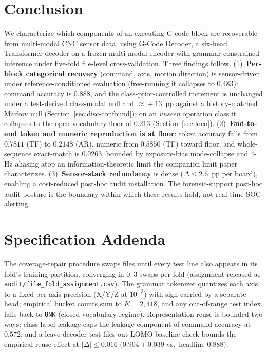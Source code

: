 \documentclass[conference]{IEEEtran}
\newcommand{\modelname}{G-Code Decoder}
\begin{document}
\section{Conclusion}
\label{sec:conclusion}

We characterize which components of an executing G-code block are recoverable from multi-modal CNC sensor data, using \modelname{}, a six-head Transformer decoder on a frozen multi-modal encoder with grammar-constrained inference under five-fold file-level cross-validation. Three findings follow. (1)~\textbf{Per-block categorical recovery} (command, axis, motion direction) is sensor-driven under reference-conditioned evaluation (free-running it collapses to $0.483$): command accuracy is $0.888$, and the class-prior-controlled increment is unchanged under a test-derived class-modal null and $\approx\!+13$~pp against a history-matched Markov null (Section~\ref{sec:disc-confound}); on an \emph{unseen} operation class it collapses to the open-vocabulary floor of $0.213$ (Section~\ref{sec:loco}). (2)~\textbf{End-to-end token and numeric reproduction is at floor}: token accuracy falls from $0.7811$ (TF) to $0.2148$ (AR), numeric from $0.5850$ (TF) toward floor, and whole-sequence exact-match is $0.0263$, bounded by exposure-bias mode-collapse and 4-Hz aliasing atop an information-theoretic limit the companion limit paper~\cite{paperB_entropy} characterizes. (3)~\textbf{Sensor-stack redundancy} is dense ($\Delta\!\le\!2.6$~pp per board), enabling a cost-reduced post-hoc audit installation. The forensic-support post-hoc audit posture is the boundary within which these results hold, not real-time SOC alerting.

\appendices
\section{Specification Addenda}
\label{app3:addenda}\label{app:spec-addenda}

The coverage-repair procedure swaps files until every test line also appears in its fold's training partition, converging in $0$--$3$ swaps per fold (assignment released as \texttt{audit/file\_fold\_assignment.csv}). The grammar tokenizer quantizes each axis to a fixed per-axis precision (X/Y/Z at $10^{-3}$) with sign carried by a separate head; empirical bucket counts sum to $K\!=\!2{,}418$, and any out-of-range test index falls back to \texttt{UNK} (closed-vocabulary regime). Representation reuse is bounded two ways: class-label leakage caps the leakage component of command accuracy at $0.572$, and a leave-decoder-test-files-out LOMO-baseline check bounds the empirical reuse effect at $|\Delta|\!\le\!0.016$ ($0.904 \pm 0.039$ vs.\ headline $0.888$).
\end{document}
